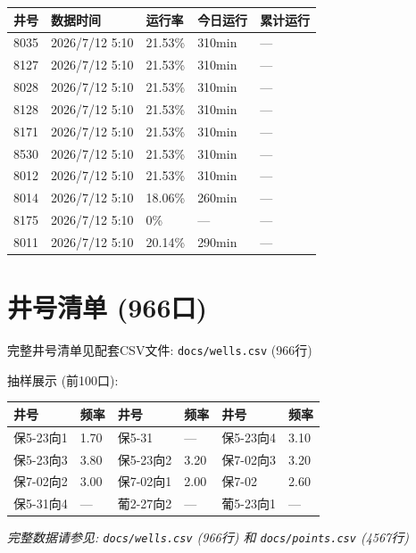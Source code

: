 \documentclass[12pt,a4paper]{ctexart}
\begin{document}
\begin{longtable}{p{2.5cm}p{3cm}p{3cm}p{3cm}p{4cm}}
\toprule
\textbf{井号} & \textbf{数据时间} & \textbf{运行率} & \textbf{今日运行} & \textbf{累计运行} \\
\midrule
8035 & 2026/7/12 5:10 & 21.53\% & 310min & — \\
8127 & 2026/7/12 5:10 & 21.53\% & 310min & — \\
8028 & 2026/7/12 5:10 & 21.53\% & 310min & — \\
8128 & 2026/7/12 5:10 & 21.53\% & 310min & — \\
8171 & 2026/7/12 5:10 & 21.53\% & 310min & — \\
8530 & 2026/7/12 5:10 & 21.53\% & 310min & — \\
8012 & 2026/7/12 5:10 & 21.53\% & 310min & — \\
8014 & 2026/7/12 5:10 & 18.06\% & 260min & — \\
8175 & 2026/7/12 5:10 & 0\% & — & — \\
8011 & 2026/7/12 5:10 & 20.14\% & 290min & — \\
\bottomrule
\end{longtable}

\section{井号清单 (966口)}

\noindent 完整井号清单见配套CSV文件: \texttt{docs/wells.csv} (966行)

\vspace{8pt}
\noindent 抽样展示 (前100口):

\begin{longtable}{p{3cm}p{2.5cm}p{3cm}p{2.5cm}p{3cm}p{2.5cm}}
\toprule
\textbf{井号} & \textbf{频率} & \textbf{井号} & \textbf{频率} & \textbf{井号} & \textbf{频率} \\
\midrule
保5-23向1 & 1.70 & 保5-31 & — & 保5-23向4 & 3.10 \\
保5-23向3 & 3.80 & 保5-23向2 & 3.20 & 保7-02向3 & 3.20 \\
保7-02向2 & 3.00 & 保7-02向1 & 2.00 & 保7-02 & 2.60 \\
保5-31向4 & — & 葡2-27向2 & — & 葡5-23向1 & — \\
\bottomrule
\end{longtable}

\vspace{12pt}
\begin{center}
\textit{完整数据请参见: \texttt{docs/wells.csv} (966行) 和 \texttt{docs/points.csv} (4567行)}
\end{center}
\end{document}
